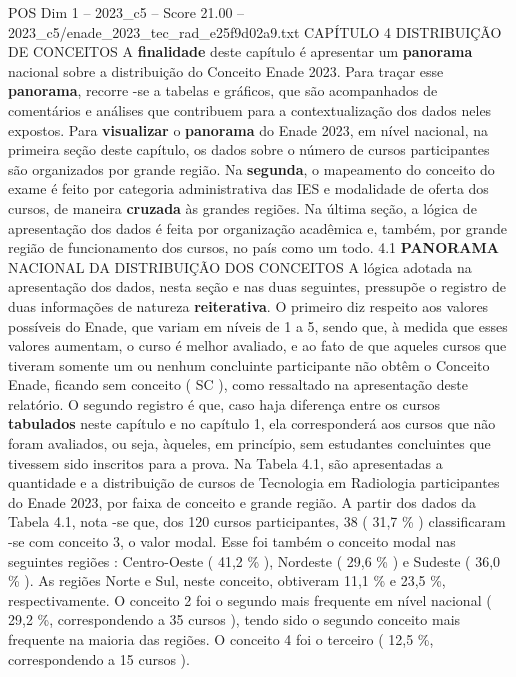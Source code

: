 \begin{textsample}{POS Dim 1 – 2023\_c5 – Score 21.00 – 2023\_c5/enade\_2023\_tec\_rad\_e25f9d02a9.txt}  \label{ex:f1_pos_017}
CAPÍTULO 4 DISTRIBUIÇÃO DE CONCEITOS A \textbf{finalidade} deste capítulo é apresentar um \textbf{panorama} nacional sobre a distribuição do Conceito Enade 2023.
Para traçar esse \textbf{panorama}, recorre -se a tabelas e gráficos, que são acompanhados de comentários e análises que contribuem para a contextualização dos dados neles expostos.
Para \textbf{visualizar} o \textbf{panorama} do Enade 2023, em nível nacional, na primeira seção deste capítulo, os dados sobre o número de cursos participantes são organizados por grande região.
Na \textbf{segunda}, o mapeamento do conceito do exame é feito por categoria administrativa das IES e modalidade de oferta dos cursos, de maneira \textbf{cruzada} às grandes regiões.
Na última seção, a lógica de apresentação dos dados é feita por organização acadêmica e, também, por grande região de funcionamento dos cursos, no país como um todo. 4.1 \textbf{PANORAMA} NACIONAL DA DISTRIBUIÇÃO DOS CONCEITOS A lógica adotada na apresentação dos dados, nesta seção e nas duas seguintes, pressupõe o registro de duas informações de natureza \textbf{reiterativa}.
O primeiro diz respeito aos valores possíveis do Enade, que variam em níveis de 1 a 5, sendo que, à medida que esses valores aumentam, o curso é melhor avaliado, e ao fato de que aqueles cursos que tiveram somente um ou nenhum concluinte participante não obtêm o Conceito Enade, ficando sem conceito ( SC ), como ressaltado na apresentação deste relatório.
O segundo registro é que, caso haja diferença entre os cursos \textbf{tabulados} neste capítulo e no capítulo 1, ela corresponderá aos cursos que não foram avaliados, ou seja, àqueles, em princípio, sem estudantes concluintes que tivessem sido inscritos para a prova.
Na Tabela 4.1, são apresentadas a quantidade e a distribuição de cursos de Tecnologia em Radiologia participantes do Enade 2023, por faixa de conceito e grande região.
A partir dos dados da Tabela 4.1, nota -se que, dos 120 cursos participantes, 38 ( 31,7 \% ) classificaram -se com conceito 3, o valor modal.
Esse foi também o conceito modal nas seguintes regiões : Centro-Oeste ( 41,2 \% ), Nordeste ( 29,6 \% ) e Sudeste ( 36,0 \% ).
As regiões Norte e Sul, neste conceito, obtiveram 11,1 \% e 23,5 \%, respectivamente.
O conceito 2 foi o segundo mais frequente em nível nacional ( 29,2 \%, correspondendo a 35 cursos ), tendo sido o segundo conceito mais frequente na maioria das regiões.
O conceito 4 foi o terceiro ( 12,5 \%, correspondendo a 15 cursos ).

\end{textsample}
